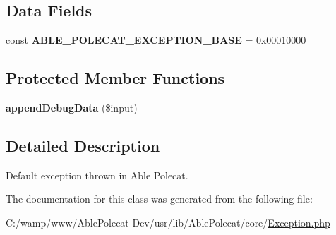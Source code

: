 \subsection*{Data Fields}
\begin{DoxyCompactItemize}
\item 
\hypertarget{class_able_polecat___exception_a4a02c971fa24160a803a122d17dc5b40}{}const {\bfseries A\+B\+L\+E\+\_\+\+P\+O\+L\+E\+C\+A\+T\+\_\+\+E\+X\+C\+E\+P\+T\+I\+O\+N\+\_\+\+B\+A\+S\+E} = 0x00010000\label{class_able_polecat___exception_a4a02c971fa24160a803a122d17dc5b40}

\end{DoxyCompactItemize}
\subsection*{Protected Member Functions}
\begin{DoxyCompactItemize}
\item 
\hypertarget{class_able_polecat___exception_ac4fa8ae13c1616a119b60b456ab6721d}{}{\bfseries append\+Debug\+Data} (\$input)\label{class_able_polecat___exception_ac4fa8ae13c1616a119b60b456ab6721d}

\end{DoxyCompactItemize}


\subsection{Detailed Description}
Default exception thrown in Able Polecat. 

The documentation for this class was generated from the following file\+:\begin{DoxyCompactItemize}
\item 
C\+:/wamp/www/\+Able\+Polecat-\/\+Dev/usr/lib/\+Able\+Polecat/core/\hyperlink{_exception_8php}{Exception.\+php}\end{DoxyCompactItemize}
